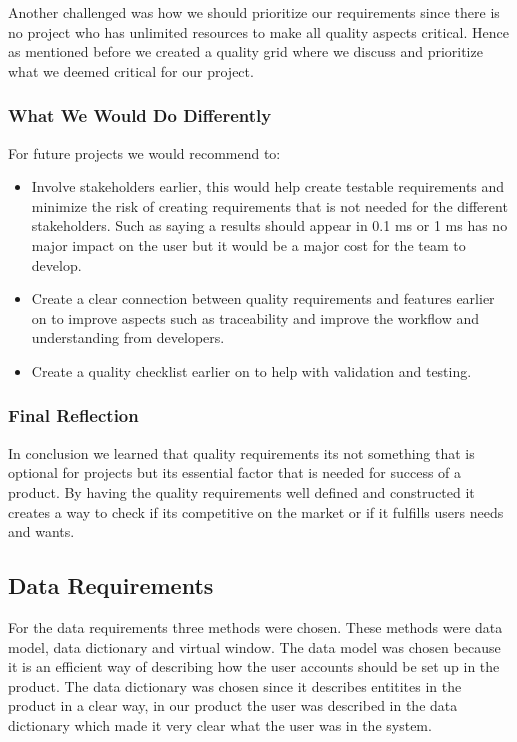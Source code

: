 Another challenged was how we should prioritize our requirements since there is no project who has unlimited resources to make all quality aspects critical. Hence as mentioned before we created a quality grid where we discuss and prioritize what we deemed critical for our project.


\subsubsection{What We Would Do Differently}
For future projects we would recommend to:
\begin{itemize}
    \item Involve stakeholders earlier, this would help create testable requirements and minimize the risk of creating requirements that is not needed for the different stakeholders. Such as saying a results should appear in 0.1 ms or 1 ms has no major impact on the user but it would be a major cost for the team to develop.
    \item Create a clear connection between quality requirements and features earlier on to improve aspects such as traceability and improve the workflow and understanding from developers.
    \item Create a quality checklist earlier on to help with validation and testing.
\end{itemize}

\subsubsection{Final Reflection}
In conclusion we learned that quality requirements its not something that is optional for projects but its essential factor that is needed for success of a product. By having the quality requirements well defined and constructed it creates a way to check if its competitive on the market or if it fulfills users needs and wants.



\subsection{Data Requirements}

For the data requirements three methods were chosen. These methods were data model, data dictionary and virtual window. The data model was chosen because it is an efficient
way of describing how the user accounts should be set up in the product. The data dictionary was chosen since it describes entitites in the product in a clear way, in our product the
user was described in the data dictionary which made it very clear what the user was in the system.

